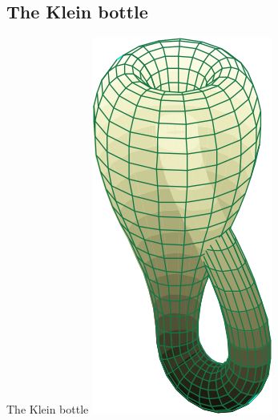 \documentclass[12pt,compress,ngerman,utf8,t]{beamer}
\begin{document}
%
%

\subsection{The Klein bottle}

\begin{frame}{The Klein bottle}
  \centering
  \includegraphics[height=0.75\textheight]{klein-bottle}
  \par
\end{frame}
\end{document}
